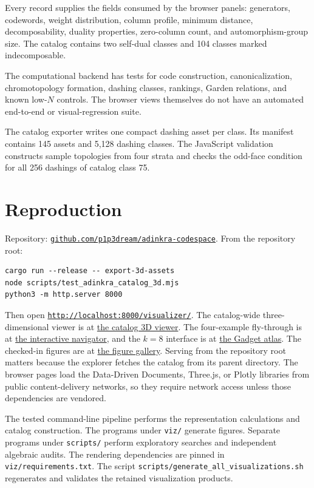 \documentclass[11pt]{article}
\newcommand{\pathcode}[1]{\nolinkurl{#1}}
\begin{document}
Every record supplies the fields consumed by the browser panels: generators,
codewords, weight distribution, column profile, minimum distance,
decomposability, duality properties, zero-column count, and
automorphism-group size.  The catalog contains two self-dual classes and 104
classes marked indecomposable.

The computational backend has tests for code construction, canonicalization,
chromotopology formation, dashing classes, rankings, Garden relations, and
known low-$N$ controls.  The browser views themselves do not have an automated
end-to-end or visual-regression suite.

The catalog exporter writes one compact dashing asset per class.  Its manifest
contains 145 assets and 5,128 dashing classes.  The JavaScript validation
constructs sample topologies from four strata and checks the odd-face condition
for all 256 dashings of catalog class 75.

\section{Reproduction}

Repository:
\href{https://github.com/p1p3dream/adinkra-codespace}{\texttt{github.com/p1p3dream/adinkra-codespace}}.
From the repository root:

\begin{verbatim}
cargo run --release -- export-3d-assets
node scripts/test_adinkra_catalog_3d.mjs
python3 -m http.server 8000
\end{verbatim}

Then open
\href{http://localhost:8000/visualizer/}{\texttt{http://localhost:8000/visualizer/}}.
The catalog-wide three-dimensional viewer is at
\href{http://localhost:8000/visualizer/adinkra_catalog_3d.html}{the catalog 3D viewer}.
The four-example fly-through is at
\href{http://localhost:8000/visualizer/adinkra_interactive.html}{the interactive navigator},
and the $k=8$ interface is at
\href{http://localhost:8000/visualizer/k8_gadget_atlas.html}{the Gadget atlas}.
The checked-in figures are at
\href{http://localhost:8000/visualizer/adinkra_gallery.html}{the figure gallery}.
Serving from the repository root matters because the explorer fetches the
catalog from its parent directory.  The browser pages load the Data-Driven
Documents, Three.js, or Plotly libraries from public content-delivery networks,
so they require network access unless those dependencies are vendored.

The tested command-line pipeline performs the representation calculations and
catalog construction.  The programs under \pathcode{viz/} generate figures.
Separate programs under \pathcode{scripts/} perform exploratory searches and independent
algebraic audits.  The rendering dependencies are pinned in
\pathcode{viz/requirements.txt}.  The script
\pathcode{scripts/generate_all_visualizations.sh} regenerates and validates the
retained visualization products.
\end{document}
